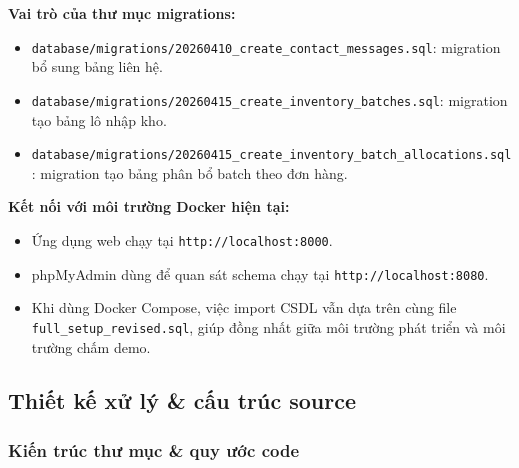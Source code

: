 \documentclass[a4paper]{article}
\begin{document}
\textbf{Vai trò của thư mục migrations:}
\begin{itemize}
    \item \texttt{database/migrations/20260410\_create\_contact\_messages.sql}: migration bổ sung bảng liên hệ.
    \item \texttt{database/migrations/20260415\_create\_inventory\_batches.sql}: migration tạo bảng lô nhập kho.
    \item \texttt{database/migrations/20260415\_create\_inventory\_batch\_allocations.sql}: migration tạo bảng phân bổ batch theo đơn hàng.
\end{itemize}

\textbf{Kết nối với môi trường Docker hiện tại:}
\begin{itemize}
    \item Ứng dụng web chạy tại \texttt{http://localhost:8000}.
    \item phpMyAdmin dùng để quan sát schema chạy tại \texttt{http://localhost:8080}.
    \item Khi dùng Docker Compose, việc import CSDL vẫn dựa trên cùng file \texttt{full\_setup\_revised.sql}, giúp đồng nhất giữa môi trường phát triển và môi trường chấm demo.
\end{itemize}

\subsection{Thiết kế xử lý \& cấu trúc source}

\subsubsection{Kiến trúc thư mục \& quy ước code}
\end{document}
